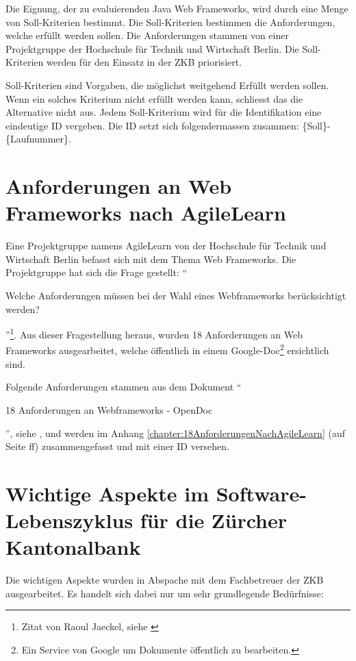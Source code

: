   Die Eignung, der zu evaluierenden Java Web Frameworks, wird durch eine Menge
  von Soll-Kriterien bestimmt. Die Soll-Kriterien bestimmen die Anforderungen,
  welche erfüllt werden sollen. Die Anforderungen stammen von einer
  Projektgruppe der Hochschule für Technik und Wirtschaft Berlin. Die
  Soll-Kriterien werden für den Einsatz in der \ac{ZKB} priorisiert.
  
  Soll-Kriterien sind Vorgaben, die möglichst weitgehend Erfüllt werden sollen.
  Wenn ein solches Kriterium nicht erfüllt werden kann, schliesst das die
  Alternative nicht aus. Jedem Soll-Kriterium wird für die Identifikation eine
  eindeutige ID vergeben. Die ID setzt sich folgendermassen zusammen: 
  \{Soll\}-\{Laufnummer\}.
  
  \section{Anforderungen an Web Frameworks nach AgileLearn}
  
  Eine Projektgruppe namens AgileLearn von der Hochschule für Technik und
  Wirtschaft Berlin befasst sich mit dem Thema Web Frameworks. Die
  Projektgruppe hat sich die Frage gestellt: ``\begin{itshape}Welche
  Anforderungen müssen bei der Wahl eines Webframeworks berücksichtigt
  werden?\end{itshape}''\footnote{Zitat von Raoul Jaeckel, siehe
  \cite{AnforderungenAnWebframeworks}}. Aus dieser Fragestellung heraus, wurden
  18 Anforderungen an Web Frameworks ausgearbeitet, welche öffentlich in einem
  Google-Doc\footnote{Ein Service von Google um Dokumente öffentlich zu
  bearbeiten.} ersichtlich sind.
  
  Folgende Anforderungen stammen aus dem Dokument ``\begin{itshape}18
  Anforderungen an Webframeworks -
  OpenDoc\end{itshape}'', siehe \cite{AnforderungenAnWebframeworks}, und werden
  im Anhang \ref{chapter:18AnforderungenNachAgileLearn}
   (auf Seite
  \pageref{chapter:18AnforderungenNachAgileLearn}ff) zusammengefasst und mit
  einer ID versehen.
    
  \section{Wichtige Aspekte im Software-Lebenszyklus für die Zürcher
  Kantonalbank}
  
  Die wichtigen Aspekte wurden in Abspache mit dem Fachbetreuer der \ac{ZKB}
  ausgearbeitet. Es handelt sich dabei nur um sehr grundlegende Bedürfnisse:
  
